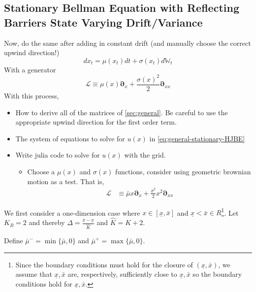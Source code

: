 \documentclass[11pt]{article}
\newcommand{\D}[1][]{\ensuremath{\boldsymbol{\partial}_{#1}}}
\newcommand{\W}{\ensuremath{\mathbb{W}}}
\begin{document}
\subsection{Stationary Bellman Equation with Reflecting Barriers State Varying Drift/Variance}
Now, do the same after adding in constant drift (and manually choose the correct upwind direction!)
$$
d x_t = \mu(x_t) dt + \sigma(x_t) d\W_t
$$
With a generator
$$
\mathcal{L} \equiv \mu(x) \D[x] + \frac{\sigma(x)^2}{2}\D[xx]
$$
With this process,
\begin{itemize}
	\item How to derive all of the matrices of \cref{sec:general}.  Be careful to use the appropriate upwind direction for the first order term.
	\item The system of equations to solve for $u(x)$ in \cref{eq:general-stationary-HJBE}
	\item Write julia code to solve for $u(x)$ with the grid.
	\begin{itemize}
		\item Choose a $\mu(x)$ and $\sigma(x)$ functions, consider using geometric brownian motion as a test.  That is,
		\begin{align}
			\mathcal{L} &\equiv \bar{\mu} x \D[x] + \frac{\bar{\sigma}^2}{2}x^2\D[xx]
		\end{align}
	\end{itemize}
\end{itemize}

We first consider a one-dimension case where $x\in [\underline{\textit{\~{x}}}, \bar{\textit{\~{x}}}]$ and $\underline{\textit{\~{x}}} < \bar{\textit{\~{x}}} \in R$\footnote{Since the boundary conditions must hold for the closure of $(\underline{x},\bar{x})$, we assume that $\underline{\textit{\~{x}}}, \bar{\textit{\~{x}}}$ are, respectively, sufficiently close to $\underline{x}, \bar{x}$ so the boundary conditions hold for $\underline{\textit{\~{x}}}, \bar{\textit{\~{x}}}$.}. Let $K_B = 2$ and thereby $\Delta  = \frac{\bar{\textit{\~{x}}} - \underline{\textit{\~{x}}}}{\hat{K}}$ and $\hat{K} = K+2$. 

Define $\bar{\mu}^- = \min\{\bar{\mu}, 0\}$ and $\bar{\mu}^+  = \max\{\bar{\mu}, 0\}$.
\end{document}
